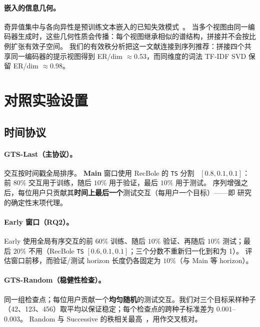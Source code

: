 \documentclass[sigconf,natbib=true,anonymous]{acmart}
\newcommand{\tfidf}{\textsc{TF-IDF}\xspace}
\begin{document}
\paragraph{嵌入的信息几何。}
奇异值集中与各向异性是预训练文本嵌入的已知失效模式~\cite{ethayarajh2019contextual}。
当多个视图由同一编码器生成时，这些几何性质会传播：每个视图继承相似的谱结构，拼接并不会按比例扩张有效子空间。
我们的有效秩分析把这一文献连接到序列推荐：拼接四个共享同一编码器的提示视图得到 ER/dim $\approx$0.53，而同维度的词法 \tfidf SVD 保留 ER/dim $\approx$0.98。

\section{对照实验设置}
\label{sec:setup}

\subsection{时间协议}
\label{sec:protocol}

\paragraph{GTS-Last（主协议）。}
交互按时间戳全局排序。
\textbf{Main} 窗口使用 RecBole 的 \texttt{TS} 分割~\cite{zhao2021recbole} $[0.8,0.1,0.1]$：前 $80\%$ 交互用于训练，随后 $10\%$ 用于验证，最后 $10\%$ 用于测试。
序列增强之后，每位用户只贡献其\textbf{时间上最后一个}测试交互（每用户一个目标）——即 \citet{gusak2025time} 研究的确定性末项代理。

\paragraph{Early 窗口（RQ2）。}
Early 使用全局有序交互的前 $60\%$ 训练、随后 $10\%$ 验证、再随后 $10\%$ 测试；最后 $20\%$ 不用（RecBole \texttt{TS} $[0.6,0.1,0.1]$；三个分数不重新归一化到和为 1）。
评估窗口前移，而验证/测试 horizon 长度仍各固定为 $10\%$（与 Main 等 horizon）。

\paragraph{GTS-Random（稳健性检查）。}
同一组检查点；每位用户贡献一个\textbf{均匀随机}的测试交互。我们对三个目标采样种子（42、123、456）取平均以保证稳定；每个检查点的跨种子标准差为 0.001--0.003。
Random 与 Successive 的秩相关最高~\cite{gusak2025time}，用作交叉核对。
\end{document}
